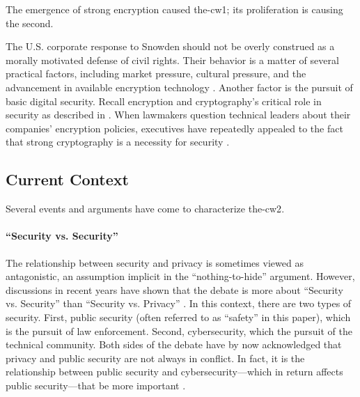 The emergence of strong encryption caused \ac{the-cw1}; its proliferation is causing the second.

The U.S. corporate response to Snowden should not be overly construed as a morally motivated defense of civil rights.
Their behavior is a matter of several practical factors, including market pressure, cultural pressure, and the
advancement in available encryption technology \cite{treguer_us_2018}. Another factor is the pursuit of basic digital
security. Recall encryption and cryptography's critical role in security as described in . When
lawmakers question technical leaders about their companies' encryption policies, executives have repeatedly appealed to
the fact that strong cryptography is a necessity for security \cite{schulze_clipper_2017}.

\subsection{Current Context}
\label{sec-history-current}

Several events and arguments have come to characterize \ac{the-cw2}.

\paragraph*{``Security vs. Security''} The relationship between security and privacy is sometimes viewed as
antagonistic, an assumption implicit in the ``nothing-to-hide'' argument. However, discussions in recent years have
shown that the debate is more about ``Security vs. Security'' than ``Security vs. Privacy''
\cite{stalla_bourdillon_privacy_2014}. In this context, there are two types of security. First, public security (often
referred to as ``safety'' in this paper), which is the pursuit of law enforcement. Second, cybersecurity, which the
pursuit of the technical community. Both sides of the debate have by now acknowledged that privacy and public security
are not always in conflict. In fact, it is the relationship between public security and cybersecurity---which in return
affects public security---that be more important \cite{schneier_2019}.

